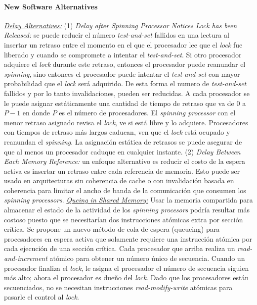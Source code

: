 \paragraph{\textnormal{\textbf{New Software Alternatives}}}
\underline{\textit{Delay Alternatives:}} (1) \textit{Delay after Spinning Processor Notices Lock has been Released:} se puede reducir el número \textit{test-and-set} fallidos en una lectura al insertar un retraso entre el momento en el que el procesador lee que el \textit{lock} fue liberado y cuando se compromete a intentar el \textit{test-and-set}. Si otro procesador adquiere el \textit{lock} durante este retraso, entonces el procesador puede reanundar el \textit{spinning}, sino entonces el procesador puede intentar el \textit{test-and-set} con mayor probabilidad que el \textit{lock} será adquirido. De esta forma el numero de \textit{test-and-set} fallidos y por lo tanto invalidaciones, pueden ser reducidas. A cada procesador se le puede asignar estáticamente una cantidad de tiempo de retraso que va de $0$ a $P - 1$ en donde $P$ es el número de procesadores. El \textit{spinning processor} con el menor retraso asignado revisa el \textit{lock}, ve si está libre y lo adquiere. Procesadores con tiempos de retraso más largos   caducan, ven que el \textit{lock} está ocupado y reanundan el \textit{spinning}. La asignación estática de retrasos se puede asegurar de que al menos un procesador caduque en cualquier instante. (2) \textit{Delay Between Each Memory Reference:} un enfoque alternativo es reducir el costo de la espera activa es insertar un retraso entre cada referencia de memoria. Esto puede ser usado en arquitecturas sin coherencia de cache o con invalidación basada en coherencia para limitar el ancho de banda de la comunicación que consumen los \textit{spinning processors}. \underline{\textit{Queing in Shared Memory:}} Usar la memoria compartida para almacenar el estado de la actividad de los \textit{spinning procesors} podría resultar más costoso puesto que se necesitarían dos instrucciones atómicas extra por sección crítica. Se propone un nuevo método de cola de espera (queueing) para procesadores en espera activa que solamente requiere una instrucción atómica por cada ejecución de una sección crítica. Cada procesador que arriba realiza un \textit{read-and-increment} atómico para obtener un número único de secuencia. Cuando un procesador finaliza el \textit{lock}, le asigna el procesador el número de secuencia siguien más alto; ahora el procesador es dueño del \textit{lock}. Dado que los procesadores están secuenciados, no se necesitan instrucciones \textit{read-modify-write} atómicas para pasarle el control al \textit{lock}.

